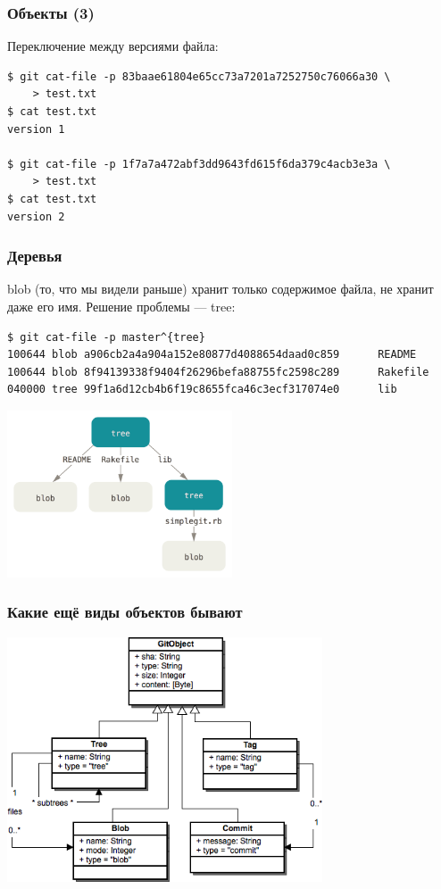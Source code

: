 \documentclass[xetex,mathserif,serif]{beamer}
\begin{document}
	\begin{frame}[fragile]
		\frametitle{Объекты (3)}
		Переключение между версиями файла:
		\begin{verbatim}
$ git cat-file -p 83baae61804e65cc73a7201a7252750c76066a30 \
    > test.txt
$ cat test.txt
version 1

$ git cat-file -p 1f7a7a472abf3dd9643fd615f6da379c4acb3e3a \
    > test.txt
$ cat test.txt
version 2
		\end{verbatim}
\end{frame}

	\begin{frame}[fragile]
		\frametitle{Деревья}
		blob (то, что мы видели раньше) хранит только содержимое файла, не хранит даже его имя. Решение проблемы --- tree:
		\begin{scriptsize}
		\begin{verbatim}
$ git cat-file -p master^{tree}
100644 blob a906cb2a4a904a152e80877d4088654daad0c859      README
100644 blob 8f94139338f9404f26296befa88755fc2598c289      Rakefile
040000 tree 99f1a6d12cb4b6f19c8655fca46c3ecf317074e0      lib
		\end{verbatim}
		\end{scriptsize}
		\begin{center}
			\includegraphics[width=0.5\textwidth]{gitTreeObject.png}
		\end{center}
\end{frame}

	\begin{frame}
		\frametitle{Какие ещё виды объектов бывают}
		\begin{center}
			\includegraphics[width=0.7\textwidth]{gitDataStructure.png}
		\end{center}
	\end{frame}
\end{document}
